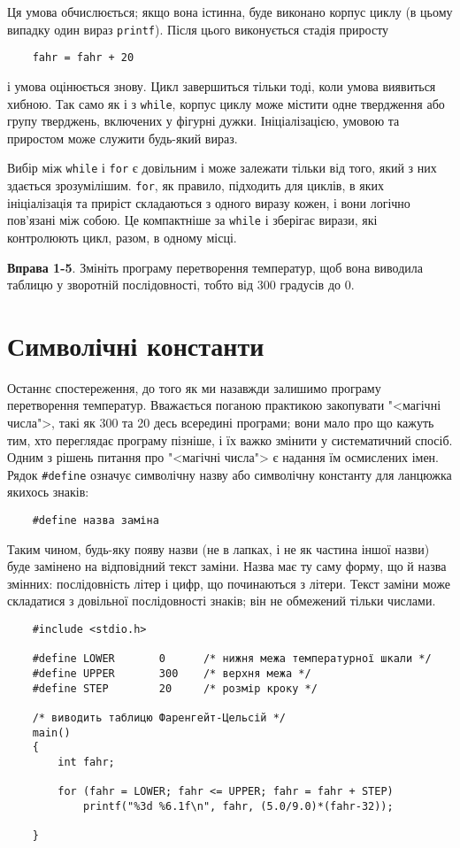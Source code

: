 \documentclass[a4paper,12pt]{book}
\begin{document}
  Ця умова обчислюється; якщо вона істинна, буде виконано корпус циклу (в цьому випадку
  один вираз \texttt{printf}). Після цього виконується стадія приросту
  \begin{verbatim}
    fahr = fahr + 20
  \end{verbatim}
  і умова оцінюється знову. Цикл завершиться тільки тоді, коли умова виявиться хибною. Так
  само як і з \texttt{while}, корпус циклу може містити одне твердження або групу
  тверджень, включених у фігурні дужки. Ініціалізацією, умовою та приростом може служити
  будь-який вираз.

  Вибір між \texttt{while} і \texttt{for} є довільним і може залежати тільки від того,
  який з них здається зрозумілішим. \texttt{for}, як правило, підходить для циклів, в яких
  ініціалізація та приріст складаються з одного виразу кожен, і вони логічно пов'язані між
  собою. Це компактніше за \texttt{while} і зберігає вирази, які контролюють цикл, разом,
  в одному місці.

  \textbf{Вправа 1-5}. Змініть програму перетворення температур, щоб вона виводила таблицю
  у зворотній послідовності, тобто від 300 градусів до 0.

\section{Символічні константи}


  Останнє спостереження, до того як ми назавжди залишимо програму перетворення температур.
  Вважається поганою практикою закопувати "<магічні числа">, такі як 300 та 20
  десь всередині програми; вони мало про що кажуть тим, хто переглядає програму пізніше, і
  їх важко змінити у систематичний спосіб. Одним з рішень питання про "<магічні
  числа"> є надання їм осмислених імен. Рядок \texttt{\#define} означує символічну
  назву або символічну константу для ланцюжка якихось знаків:
  \begin{verbatim}
    #define назва заміна
  \end{verbatim}

  Таким чином, будь-яку появу назви (не в лапках, і не як частина іншої назви) буде
  замінено на відповідний текст заміни. Назва має ту саму форму, що й назва змінних:
  послідовність літер і цифр, що починаються з літери. Текст заміни може складатися з
  довільної послідовності знаків; він не обмежений тільки числами.

  \begin{verbatim}
    #include <stdio.h>

    #define LOWER       0      /* нижня межа температурної шкали */
    #define UPPER       300    /* верхня межа */
    #define STEP        20     /* розмір кроку */

    /* виводить таблицю Фаренгейт-Цельсій */
    main()
    {
        int fahr;

        for (fahr = LOWER; fahr <= UPPER; fahr = fahr + STEP)
            printf("%3d %6.1f\n", fahr, (5.0/9.0)*(fahr-32));

    }
  \end{verbatim}
\end{document}
